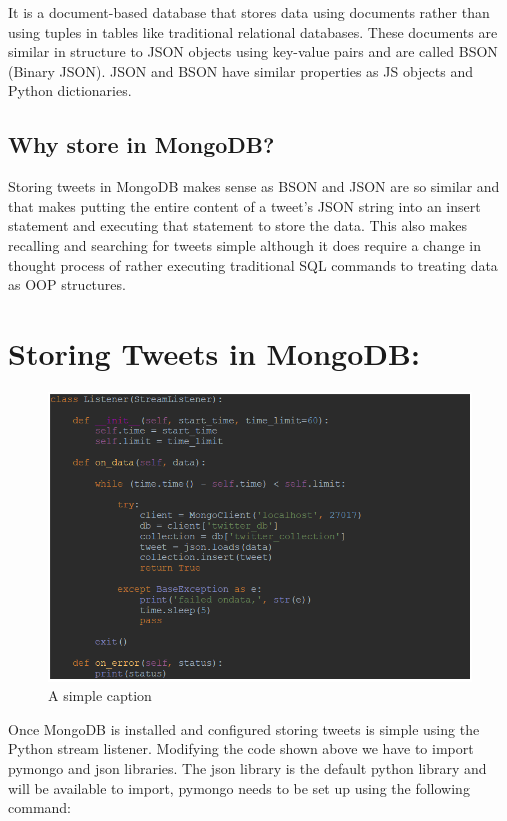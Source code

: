 It is a document-based database that stores data using documents rather than using tuples in tables like traditional relational databases. These documents are similar in structure to JSON objects using key-value pairs and are called BSON (Binary JSON). JSON and BSON have similar properties as JS objects and Python dictionaries.

\subsection{Why store in MongoDB?}

Storing tweets in MongoDB makes sense as BSON and JSON are so similar and that makes putting the entire content of a tweet’s JSON string into an insert statement and executing that statement to store the data. This also makes recalling and searching for tweets simple although it does require a change in thought process of rather executing traditional SQL commands to treating data as OOP structures.

\section{Storing Tweets in MongoDB:}

\begin{figure}[ht!]
	\centering
	\includegraphics[width=150mm]{code7.png}
	\caption{A simple caption \label{overflow}}
\end{figure}

Once MongoDB is installed and configured storing tweets is simple using the Python stream listener. Modifying the code shown above we have to import pymongo and json libraries. The json library is the default python library and will be available to import, pymongo needs to be set up using the following command:


